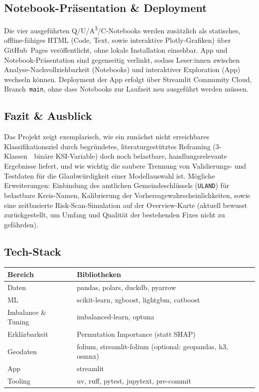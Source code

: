 \documentclass[11pt,a4paper]{article}
\newcommand{\code}[1]{\texttt{\small #1}}
\begin{document}
\subsection*{Notebook-Präsentation \& Deployment}
Die vier ausgeführten Q/U/A\textsuperscript{3}/C-Notebooks werden
zusätzlich als statisches, offline-fähiges HTML (Code, Text, sowie
interaktive Plotly-Grafiken) über GitHub~Pages veröffentlicht, ohne
lokale Installation einsehbar. App und Notebook-Präsentation sind
gegenseitig verlinkt, sodass Leser:innen zwischen
Analyse-Nachvollziehbarkeit (Notebooks) und interaktiver Exploration
(App) wechseln können. Deployment der App erfolgt über Streamlit
Community Cloud, Branch~\code{main}, ohne dass Notebooks zur Laufzeit
neu ausgeführt werden müssen.

\subsection*{Fazit \& Ausblick}
Das Projekt zeigt exemplarisch, wie ein zunächst nicht erreichbares
Klassifikationsziel durch begründetes, literaturgestütztes Reframing
(3-Klassen~\textrightarrow{}~binäre KSI-Variable) doch noch belastbare,
handlungsrelevante Ergebnisse liefert, und wie wichtig die saubere
Trennung von Validierungs- und Testdaten für die Glaubwürdigkeit einer
Modellauswahl ist. Mögliche Erweiterungen: Einbindung des amtlichen
Gemeindeschlüssels (\code{ULAND}) für belastbare Kreis-Namen,
Kalibrierung der Vorhersagewahrscheinlichkeiten, sowie eine
zeitbasierte \glqq{}Risk-Scan\grqq{}-Simulation auf der Overview-Karte
(aktuell bewusst zurückgestellt, um Umfang und Qualität der
bestehenden Fixes nicht zu gefährden).

\subsection*{Tech-Stack}
\begin{center}
\small
\begin{tabularx}{\linewidth}{lY}
\toprule
\textbf{Bereich} & \textbf{Bibliotheken} \\
\midrule
Daten & pandas, polars, duckdb, pyarrow \\
ML & scikit-learn, xgboost, lightgbm, catboost \\
Imbalance \& Tuning & imbalanced-learn, optuna \\
Erklärbarkeit & Permutation Importance (statt SHAP) \\
Geodaten & folium, streamlit-folium (optional: geopandas, h3, osmnx) \\
App & streamlit \\
Tooling & uv, ruff, pytest, jupytext, pre-commit \\
\bottomrule
\end{tabularx}
\end{center}
\end{document}
